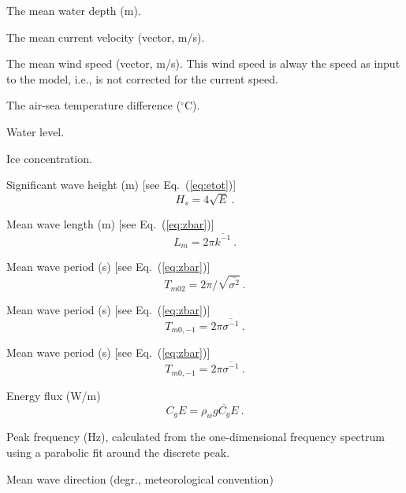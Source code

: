 \begin{list}{)\hfill}
            { \leftmargin 15mm 
             \rightmargin 5mm \itemsep 0mm \parsep 0mm}
\item The mean water depth (m).
\item The mean current velocity (vector, m/s).
\item The mean wind speed (vector, m/s). This wind speed is alway the
      speed as input to the model, i.e., is not corrected for the current
      speed.
\item The air-sea temperature difference ($^\circ$C).
\item Water level.
\item Ice concentration.
\item Significant wave height (m) [see Eq.~(\ref{eq:etot})]
      \begin{equation} H_s = 4 \sqrt{E} \: . \label{eq:Hs} \end{equation}
\item Mean wave length (m) [see Eq.~(\ref{eq:zbar})]
      \begin{equation} L_m = 2\pi \overline{k^{-1}}
      \: . \label{eq:Lm} \end{equation}
\item Mean wave period (s) [see Eq.~(\ref{eq:zbar})]
      \begin{equation} T_{m02} = 2\pi /\sqrt{\overline{\sigma^{2}}}
      \: . \label{eq:Tm02} \end{equation}
\item Mean wave period (s) [see Eq.~(\ref{eq:zbar})]
      \begin{equation} T_{m0,-1} = 2\pi \overline{\sigma^{-1}}
      \: . \label{eq:Tm0m1} \end{equation}
\item Mean wave period (s) [see Eq.~(\ref{eq:zbar})]
      \begin{equation} T_{m0,-1} = 2\pi \overline{\sigma^{-1}}
      \: . \label{eq:Tm} \end{equation}
\item Energy flux (W/m)
      \begin{equation} C_g E =  \rho_w g \overline{C_g} E
      \: . \label{eq:CgE} \end{equation}
\item Peak frequency (Hz), calculated from the one-dimensional frequency
      spectrum using a parabolic fit around the discrete peak.
\item Mean wave direction (degr., meteorological convention)

\end{list}
